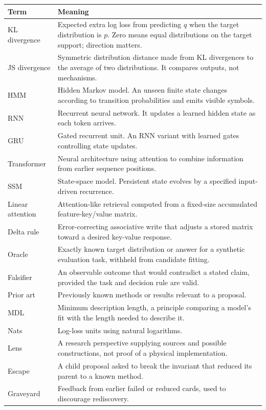 \begin{longtable}{p{3.3cm}p{10.8cm}}
\toprule Term & Meaning \\
\midrule
KL divergence & Expected extra log loss from predicting $q$ when the target distribution is $p$. Zero means equal distributions on the target support; direction matters. \\
JS divergence & Symmetric distribution distance made from KL divergences to the average of two distributions. It compares outputs, not mechanisms. \\
HMM & Hidden Markov model. An unseen finite state changes according to transition probabilities and emits visible symbols. \\
RNN & Recurrent neural network. It updates a learned hidden state as each token arrives. \\
GRU & Gated recurrent unit. An RNN variant with learned gates controlling state updates. \\
Transformer & Neural architecture using attention to combine information from earlier sequence positions. \\
SSM & State-space model. Persistent state evolves by a specified input-driven recurrence. \\
Linear attention & Attention-like retrieval computed from a fixed-size accumulated feature-key/value matrix. \\
Delta rule & Error-correcting associative write that adjusts a stored matrix toward a desired key-value response. \\
Oracle & Exactly known target distribution or answer for a synthetic evaluation task, withheld from candidate fitting. \\
Falsifier & An observable outcome that would contradict a stated claim, provided the task and decision rule are valid. \\
Prior art & Previously known methods or results relevant to a proposal. \\
MDL & Minimum description length, a principle comparing a model's fit with the length needed to describe it. \\
Nats & Log-loss units using natural logarithms. \\
Lens & A research perspective supplying sources and possible constructions, not proof of a physical implementation. \\
Escape & A child proposal asked to break the invariant that reduced its parent to a known method. \\
Graveyard & Feedback from earlier failed or reduced cards, used to discourage rediscovery. \\

\end{longtable}
